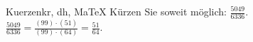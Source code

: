 \begin{MAufgabe}{Kuerzen}{kr, dh, MaTeX}
K\"urzen Sie soweit m\"oglich: $\frac{5049}{6336}$.\\ 
\ifLsg\MLoesung
\quad $\frac{5049}{6336}=\frac{(99)\cdot(51)}{(99)\cdot(64)}=\frac{51}{64}$.\else\relax\fi
 \end{MAufgabe}